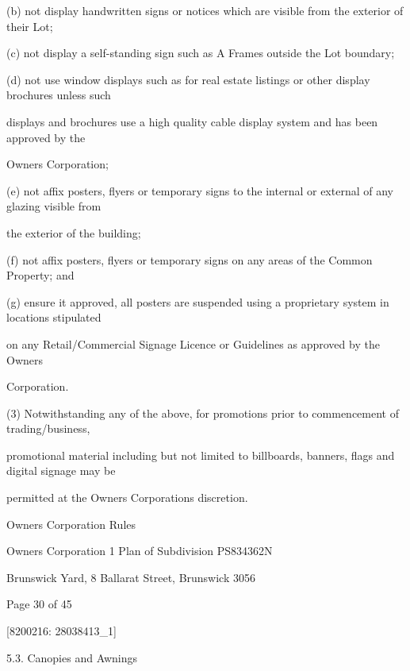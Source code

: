 \documentclass{article}
\begin{document}
{\fontsize{9.962}{1}(b) not display handwritten signs or notices which are visible from the exterior of their Lot; }

{\fontsize{9.962}{1}(c) not display a self-standing sign such as A Frames outside the Lot boundary; }

{\fontsize{9.962}{1}(d) not use window displays such as for real estate listings or other display brochures unless such }

{\fontsize{10.02}{1}displays and brochures use a high quality cable display system and has been approved by the }

{\fontsize{10.02}{1}Owners Corporation; }

{\fontsize{9.962}{1}(e) not affix posters, flyers or temporary signs to the internal or external of any glazing visible from }

{\fontsize{10.02}{1}the exterior of the building; }

{\fontsize{9.962}{1}(f) not affix posters, flyers or temporary signs on any areas of the Common Property; and }

{\fontsize{9.962}{1}(g) ensure it approved, all posters are suspended using a proprietary system in locations stipulated }

{\fontsize{10.02}{1}on any Retail/Commercial Signage Licence or Guidelines as approved by the Owners }

{\fontsize{10.02}{1}Corporation. }

{\fontsize{9.962}{1}(3) Notwithstanding any of the above, for promotions prior to commencement of trading/business, }

{\fontsize{10.02}{1}promotional material including but not limited to billboards, banners, flags and digital signage may be }

{\fontsize{10.02}{1}permitted at the Owners Corporations discretion. }

\newpage





{\fontsize{9}{1}Owners Corporation Rules }

{\fontsize{9}{1}Owners Corporation 1 Plan of Subdivision PS834362N }

{\fontsize{9}{1}Brunswick Yard, 8 Ballarat Street, Brunswick 3056 }


{\fontsize{9}{1}Page 30  of 45 }



{\fontsize{7.02}{1}[8200216: 28038413\_1] }

{\fontsize{9.99}{1}5.3. Canopies and Awnings }
\end{document}
